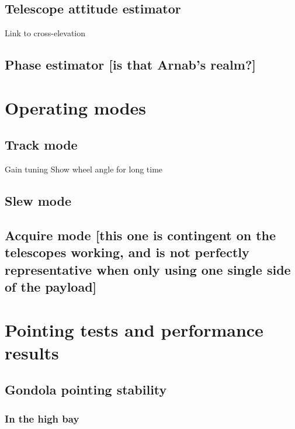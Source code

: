 \subsection{Telescope attitude estimator}
Link to cross-elevation
\subsection{Phase estimator [is that Arnab’s realm?]}

\section{Operating modes}
\subsection{Track mode}
Gain tuning
Show wheel angle for long time
\subsection{Slew mode}
\subsection{Acquire mode [this one is contingent on the telescopes working, and is not perfectly representative when only using one single side of the payload]}

\section{Pointing tests and performance results}
\subsection{Gondola pointing stability}
\subsubsection{In the high bay}

